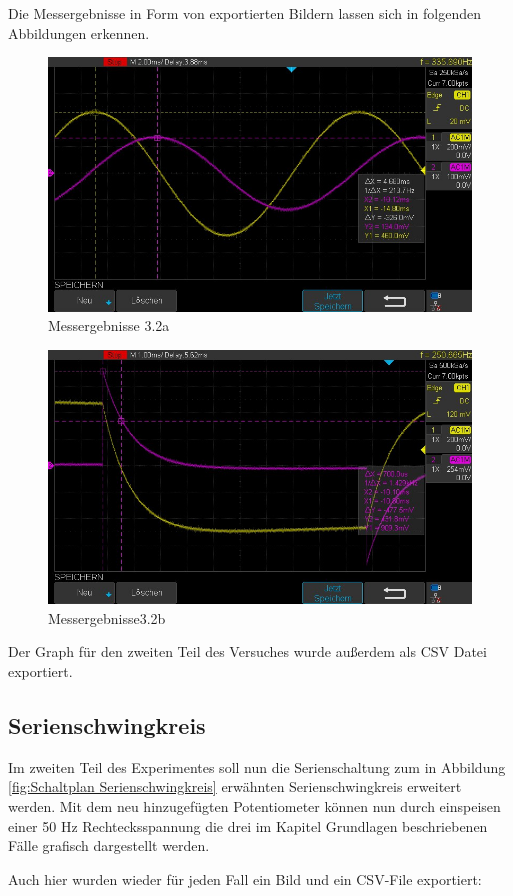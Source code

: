 \documentclass[12pt,a4paper,twoside]{article}
\begin{document}
\noindent
Die Messergebnisse in Form von exportierten Bildern lassen sich in folgenden Abbildungen erkennen.

\begin{figure}[H]
    \centering
    \includegraphics[width=0.6\linewidth, angle=0]{Messergebnisse/3.2/3.2a besser.jpg}
    \caption{Messergebnisse 3.2a}
    \label{fig:Messergebnisse3.2a}
\end{figure}

\begin{figure}[H]
    \centering
    \includegraphics[width=0.6\linewidth, angle=0]{Messergebnisse/3.2/3.2b.jpg}
    \caption{Messergebnisse3.2b}
    \label{fig:Messergebnisse3.2b}
\end{figure}

\noindent 
Der Graph für den zweiten Teil des Versuches wurde außerdem als CSV Datei exportiert.


\subsection{Serienschwingkreis}

Im zweiten Teil des Experimentes soll nun die Serienschaltung zum in Abbildung \ref{fig:Schaltplan Serienschwingkreis} erwähnten Serienschwingkreis erweitert werden.
Mit dem neu hinzugefügten Potentiometer können nun durch einspeisen einer 50 Hz Rechtecksspannung die drei im Kapitel Grundlagen beschriebenen Fälle grafisch dargestellt werden. \newline

\noindent
Auch hier wurden wieder für jeden Fall ein Bild und ein CSV-File exportiert: \newline
\end{document}

